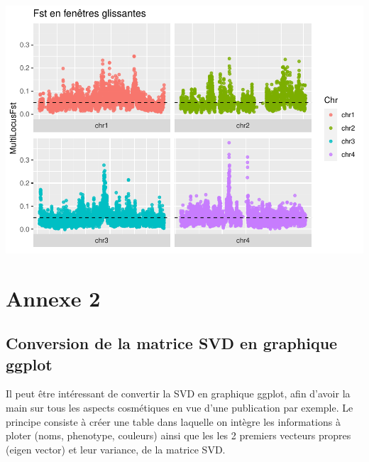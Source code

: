 \documentclass[
  openany]{book}
\theoremstyle{definition}
\theoremstyle{definition}
\theoremstyle{definition}
\theoremstyle{definition}
\theoremstyle{remark}
\begin{document}
\includegraphics{BayPass_Fr_files/figure-latex/plot-sliding-Fst-1.pdf}

\hypertarget{An2}{%
\section*{Annexe 2}\label{An2}}

\hypertarget{conversion-de-la-matrice-svd-en-graphique-ggplot}{%
\subsection*{Conversion de la matrice SVD en graphique ggplot}\label{conversion-de-la-matrice-svd-en-graphique-ggplot}}

Il peut être intéressant de convertir la SVD en graphique ggplot, afin d'avoir la main sur tous les aspects cosmétiques en vue d'une publication par exemple.
Le principe consiste à créer une table dans laquelle on intègre les informations à ploter (noms, phenotype, couleurs) ainsi que les les 2 premiers vecteurs propres (eigen vector) et leur variance, de la matrice SVD.
\end{document}
